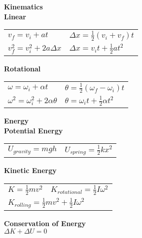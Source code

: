 \documentclass[12pt]{article}
\begin{document}
\begin{minipage}[t]{.5\textwidth}
\textbf{\large{Kinematics}} \\[6pt]
\textbf{Linear} \\[6pt]
	\begin{tabular}{p{3cm} p{6cm}}
	$v_f = v_i + at$ & \hspace{12pt} $\Delta x = \tfrac{1}{2}(v_i + v_f)t$\\[6pt]
	$v_f^2 = v_i^2 + 2a \Delta x$ & \hspace{12pt} $\Delta x = v_i t + \tfrac{1}{2} at^2$\\[12pt]
	\end{tabular}

\textbf{Rotational} \\[6pt]
	\begin{tabular}{p{3cm} p{6cm}}
	$\omega = \omega_i +\alpha t$ & \hspace{12pt} $\theta = \tfrac{1}{2} (\omega_f - \omega_i) t$ \\[6pt]
	$\omega^2 = \omega_i^2 + 2\alpha \theta$ & \hspace{12pt} $\theta = \omega_i t + \tfrac{1}{2} \alpha t^2$ \\
	\end{tabular}
\end{minipage}

\vspace{24pt}
\begin{minipage}[t]{.5\textwidth}
\textbf{\large{Energy}} \\[6pt]
\textbf{Potential Energy} \\[6pt]
	\begin{tabular}{p{3cm} p{6cm}}
	$U_{gravity} = mgh$ & $U_{spring} = \tfrac{1}{2} kx^2$ \\[12pt]
	\end{tabular}

\textbf{Kinetic Energy} \\[6pt]
	\begin{tabular}{p{3cm} p{6cm}}
	$K = \tfrac{1}{2}mv^2$ & $K_{rotational} = \tfrac{1}{2} I \omega^2$ \\[6pt]
	\multicolumn{2}{l}{	
	$K_{rolling} = \tfrac{1}{2}mv^2 + \tfrac{1}{2}I\omega^2$} \\[12pt]
	\end{tabular}

\textbf{Conservation of Energy} \\[6pt]
	$\Delta K + \Delta U = 0$\\[12pt]

\end{minipage}
\end{document}
